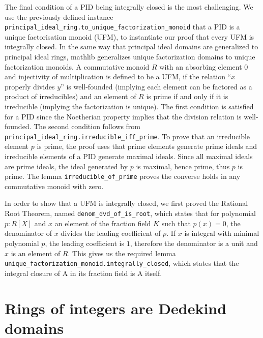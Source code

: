 \documentclass[a4paper,USenglish,cleveref, autoref, thm-restate]{lipics-v2021}
\newcommand{\lean}[1]{\texttt{#1}\xspace} %
\newcommand{\mathlib}{\textsf{mathlib}\xspace}
\begin{document}
The final condition of a PID being integrally closed is the most challenging.
We use the previously defined instance \lean{principal\_ideal\_ring.to\_unique\_factorization\_monoid} that a PID is a unique factorisation monoid (UFM),
to instantiate our proof that every UFM is integrally closed.
In the same way that principal ideal domains are generalized to principal ideal rings, \mathlib generalizes unique factorization domains to unique factorization monoids.
A commutative monoid $R$ with an absorbing element $0$ and injectivity of multiplication is defined to be a UFM,
if the relation ``$x$ properly divides $y$'' is well-founded (implying each element can be factored as a product of irreducibles) and
an element of $R$ is prime if and only if it is irreducible (implying the factorization is unique).
The first condition is satisfied for a PID since the Noetherian property implies that the division relation is well-founded.
The second condition follows from \lean{principal\_ideal\_ring.irreducible\_iff\_prime}.
To prove that an irreducible element $p$ is prime, the proof uses that prime elements generate prime ideals and irreducible elements of a PID generate maximal ideals. Since all maximal ideals are prime ideals, the ideal generated by $p$ is maximal, hence prime, thus $p$ is prime.
The lemma \lean{irreducible\_of\_prime} proves the converse holds in any commutative monoid with zero.

In order to show that a UFM is integrally closed, we first proved the Rational Root Theorem, named \lean{denom\_dvd\_of\_is\_root},
which states that for polynomial $p : R[X]$ and $x$ an element of the fraction field $K$ such that $p(x) = 0$, the denominator of $x$ divides the leading coefficient of $p$.
If $x$ is integral with minimal polynomial $p$, the leading coefficient is $1$, therefore the denominator is a unit and $x$ is an element of $R$.
This gives us the required lemma \lean{unique\_factorization\_monoid.integrally\_closed}, which states that the integral closure of A in its fraction field is A itself.

\section{Rings of integers are Dedekind domains} \label{sec:integral-closure}
\end{document}
